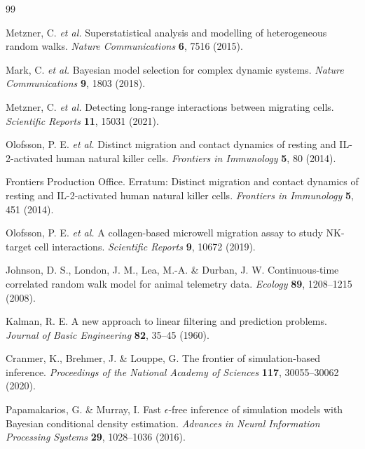 \begin{thebibliography}{99}

Metzner, C. \textit{et al.} Superstatistical analysis and modelling of
heterogeneous random walks. \textit{Nature Communications} \textbf{6},
7516 (2015).

Mark, C. \textit{et al.} Bayesian model selection for complex dynamic systems.
\textit{Nature Communications} \textbf{9}, 1803 (2018).

Metzner, C. \textit{et al.} Detecting long-range interactions between migrating
cells. \textit{Scientific Reports} \textbf{11}, 15031 (2021).

Olofsson, P. E. \textit{et al.} Distinct migration and contact dynamics of
resting and IL-2-activated human natural killer cells.
\textit{Frontiers in Immunology} \textbf{5}, 80 (2014).

Frontiers Production Office. Erratum: Distinct migration and contact dynamics
of resting and IL-2-activated human natural killer cells.
\textit{Frontiers in Immunology} \textbf{5}, 451 (2014).

Olofsson, P. E. \textit{et al.} A collagen-based microwell migration assay to
study NK-target cell interactions. \textit{Scientific Reports} \textbf{9},
10672 (2019).

Johnson, D. S., London, J. M., Lea, M.-A. \& Durban, J. W.
Continuous-time correlated random walk model for animal telemetry data.
\textit{Ecology} \textbf{89}, 1208--1215 (2008).

Kalman, R. E. A new approach to linear filtering and prediction problems.
\textit{Journal of Basic Engineering} \textbf{82}, 35--45 (1960).

Cranmer, K., Brehmer, J. \& Louppe, G. The frontier of simulation-based
inference. \textit{Proceedings of the National Academy of Sciences}
\textbf{117}, 30055--30062 (2020).

Papamakarios, G. \& Murray, I. Fast $\epsilon$-free inference of simulation
models with Bayesian conditional density estimation.
\textit{Advances in Neural Information Processing Systems} \textbf{29},
1028--1036 (2016).


\end{thebibliography}
